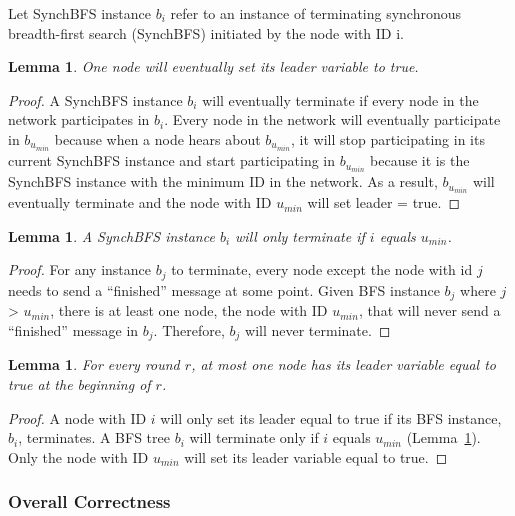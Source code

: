 \documentclass[english]{article}
\newtheorem{lemma}[theorem]{Lemma}
\begin{document}
\begin{definition}
Let SynchBFS instance $b_i$ refer to an instance of terminating synchronous breadth-first search (SynchBFS) initiated by the node with ID i.
\end{definition}

\begin{lemma}
\label{LELivenessStatic}
  One node will eventually set its leader variable to true.
\end{lemma}
\begin{proof}
A SynchBFS instance $b_i$ will eventually terminate if every node in the network participates in $b_i$. 
Every node in the network will eventually participate in $b_{u_{min}}$ because when a node hears about $b_{u_{min}}$, it will stop participating in its current SynchBFS instance and start participating in $b_{u_{min}}$ because it is the SynchBFS instance with the minimum ID in the network. As a result, $b_{u_{min}}$ will eventually terminate and the node with ID $u_{min}$ will set leader = true.
\end{proof}

\begin{lemma}
\label{BFSTermination}
  A SynchBFS instance $b_i$ will only terminate if $i$ equals $u_{min}$.
\end{lemma}
\begin{proof}

For any instance $b_j$ to terminate, every node except the node with id $j$ needs to send a ``finished'' message at some point. Given BFS instance $b_j$ where $j$ \textgreater $ $ $u_{min}$, there is at least one node, the node with ID $u_{min}$, that will never send a ``finished'' message in $b_j$. Therefore, $b_j$ will never terminate.
\end{proof}


\begin{lemma}
\label{LESafetyStatic}
For every round $r$, at most one node has its leader variable equal to true at the beginning of $r$.
\end{lemma}
\begin{proof}
A node with ID $i$ will only set its leader equal to true if its BFS instance, $b_i$, terminates.
A BFS tree $b_i$ will terminate only if $i$ equals $u_{min}$ (Lemma~\ref{BFSTermination}).
Only the node with ID $u_{min}$ will set its leader variable equal to true. 
\end{proof}

\subsubsection {Overall Correctness}
\end{document}
